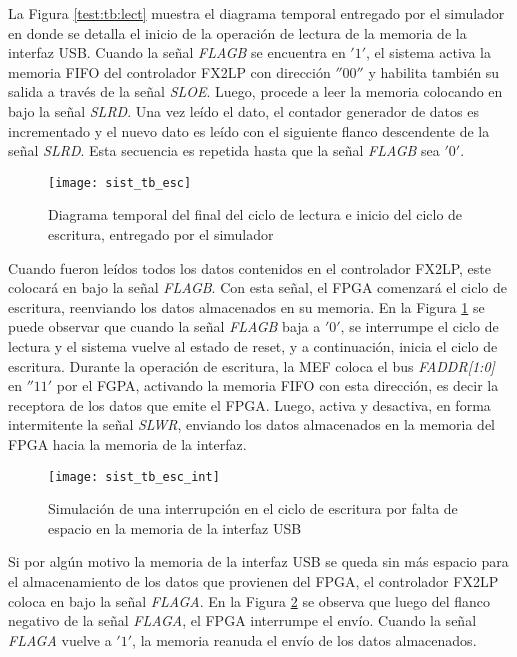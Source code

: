 	La Figura \ref{test:tb:lect} muestra el diagrama temporal entregado por el simulador en donde se detalla el inicio de la operación de lectura de la memoria de la interfaz USB. Cuando la señal \textit{FLAGB} se encuentra en $'1'$, el sistema activa la memoria FIFO del controlador FX2LP con dirección $''00''$ y habilita también su salida a través de la señal \textit{SLOE}. Luego, procede a leer la memoria colocando en bajo la señal \textit{SLRD}. Una vez leído el dato, el contador generador de datos es incrementado y el nuevo dato es leído con el siguiente flanco descendente de la señal \textit{SLRD}. Esta secuencia es repetida hasta que la señal \textit{FLAGB} sea $'0'$.
	
	\begin{figure}[b]
		\centering
		\texttt{[image: sist\_tb\_esc]}
		\caption{Diagrama temporal del final del ciclo de lectura e inicio del ciclo de escritura, entregado por el simulador}
		\label{test:tb:escr}
	\end{figure}

	Cuando fueron leídos todos los datos contenidos en el controlador FX2LP, este colocará en bajo la señal \textit{FLAGB}. Con esta señal,
	el FPGA comenzará el ciclo de escritura, reenviando los datos almacenados en su memoria. En la Figura \ref{test:tb:escr} se puede observar que cuando la señal \textit{FLAGB} baja a $'0'$, se interrumpe el ciclo de lectura y el sistema vuelve al estado de reset, y a continuación, inicia el ciclo de escritura. Durante la operación de escritura, la MEF coloca el bus \textit{FADDR[1:0]} en $''11'$ por el FGPA, activando la memoria FIFO con esta dirección, es decir la receptora de los datos que emite el FPGA. Luego, activa y desactiva, en forma intermitente la señal \textit{SLWR}, enviando los datos almacenados en la memoria del FPGA hacia la memoria de la interfaz.
	
	\begin{figure}[t]
		\centering
		\texttt{[image: sist\_tb\_esc\_int]}
		\caption{Simulación de una interrupción en el ciclo de escritura por falta de espacio en la memoria de la interfaz USB}
		\label{test:tb:int}
	\end{figure}
	
	Si por algún motivo la memoria de la interfaz USB se queda sin más espacio para el almacenamiento de los datos que provienen del FPGA, el controlador FX2LP coloca en bajo la señal \textit{FLAGA}. En la Figura \ref{test:tb:int} se observa que luego del flanco negativo de la señal \textit{FLAGA}, el FPGA interrumpe el envío. Cuando la señal \textit{FLAGA} vuelve a $'1'$, la memoria reanuda el envío de los datos almacenados.
	
